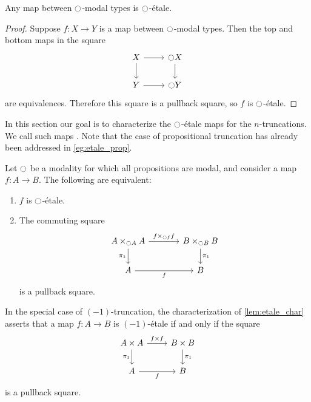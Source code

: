 \begin{lem}\label{lem:etale_modal}
Any map between ${\ocircle}$-modal types is ${\ocircle}$-\'etale.
\end{lem}

\begin{proof}
Suppose $f:X\to Y$ is a map between ${\ocircle}$-modal types. Then the top and bottom maps in the square
\begin{equation*}
\begin{tikzcd}
X \arrow[r] \arrow[d] & \modal X \arrow[d] \\
Y \arrow[r] & \modal Y
\end{tikzcd}
\end{equation*}
are equivalences. Therefore this square is a pullback square, so $f$ is ${\ocircle}$-\'etale.
\end{proof}

In this section our goal is to characterize the ${\ocircle}$-\'etale maps for the $n$-truncations. We call such maps . Note that the case of propositional truncation has already been addressed in \cref{eg:etale_prop}.

\begin{lem}\label{lem:etale_char}
Let ${\ocircle}$ be a modality for which all propositions are modal, and consider a map $f:A\to B$. The following are equivalent:
\begin{enumerate}
\item $f$ is ${\ocircle}$-\'etale.
\item The commuting square
\begin{equation*}
\begin{tikzcd}[column sep=large]
A\times_{\modal A} A \arrow[d,swap,"\pi_1"] \arrow[r,"{f\times_{\modal f} f}"] & B\times_{\modal B} B \arrow[d,"\pi_1"] \\
A \arrow[r,swap,"f"] & B
\end{tikzcd}
\end{equation*}
is a pullback square.
\end{enumerate}
\end{lem}

\begin{rmk}
In the special case of $(-1)$-truncation, the characterization of \cref{lem:etale_char} asserts that a map $f:A\to B$ is $(-1)$-\'etale if and only if the square
\begin{equation*}
\begin{tikzcd}
A\times A \arrow[d,swap,"\pi_1"] \arrow[r,"{f\times f}"] & B\times B \arrow[d,"\pi_1"] \\
A \arrow[r,swap,"f"] & B
\end{tikzcd}
\end{equation*}
is a pullback square.
\end{rmk}

